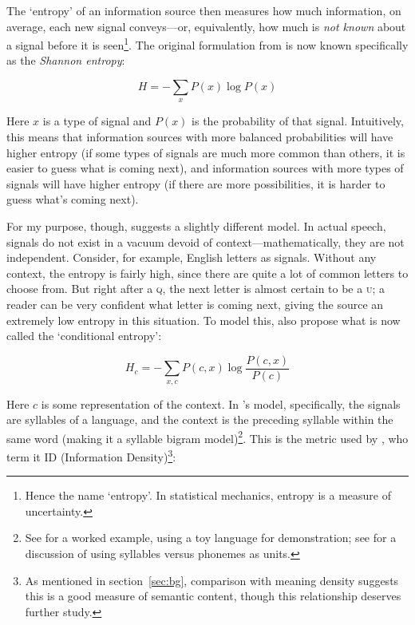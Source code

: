 \documentclass[12pt,twoside,leqno]{article} %
\begin{document}
The `entropy' of an information source then measures how much information, on average, each new signal conveys---or, equivalently, how much is \emph{not known} about a signal before it is seen\footnote{Hence the name `entropy'. In statistical mechanics, entropy is a measure of uncertainty.}. The original formulation from \citet[50]{shannon} is now known specifically as the \emph{Shannon entropy}:

\begin{equation}
\label{eqn:shannon}
H = - \sum_x P(x) \log P(x)
\end{equation}

Here \(x\) is a type of signal and \(P(x)\) is the probability of that signal. Intuitively, this means that information sources with more balanced probabilities will have higher entropy (if some types of signals are much more common than others, it is easier to guess what is coming next), and information sources with more types of signals will have higher entropy (if there are more possibilities, it is harder to guess what's coming next).

For my purpose, though, \citet{oh} suggests a slightly different model. In actual speech, signals do not exist in a vacuum devoid of context---mathematically, they are not independent. Consider, for example, English letters as signals. Without any context, the entropy is fairly high, since there are quite a lot of common letters to choose from. But right after a \textsc{q}, the next letter is almost certain to be a \textsc{u}; a reader can be very confident what letter is coming next, giving the source an extremely low entropy in this situation. To model this, \citet[52]{shannon} also propose what is now called the `conditional entropy':

\begin{equation}
H_c = - \sum_{x,c} P(c,x) \log \frac{P(c,x)}{P(c)}
\end{equation}

Here \(c\) is some representation of the context. In \citeauthor{oh}'s model, specifically, the signals are syllables of a language, and the context is the preceding syllable within the same word (making it a syllable bigram model)\footnote{See \citet[41]{oh} for a worked example, using a toy language for demonstration; see \citet[545]{pellegrino} for a discussion of using syllables versus phonemes as units.}. This is the metric used by \citet{coupé}, who term it ID (Information Density)\footnote{As mentioned in section~\ref{sec:bg}, comparison with  meaning density suggests this is a good measure of semantic content, though this relationship deserves further study.}:
\end{document}
